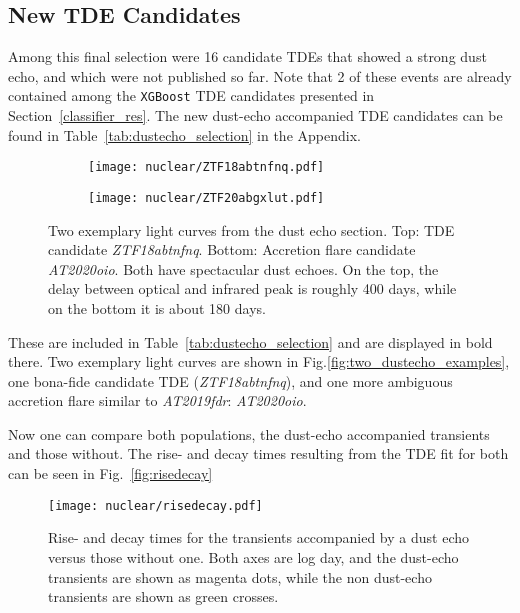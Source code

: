 \subsection{New TDE Candidates}

Among this final selection were 16 candidate TDEs that showed a strong dust echo, and which were not published so far. Note that 2 of these events are already contained among the \texttt{XGBoost} TDE candidates presented in Section~\ref{classifier_res}. The new dust-echo accompanied TDE candidates can be found in Table~\ref{tab:dustecho_selection} in the Appendix.

\begin{figure}[h!]
  \centering
  \begin{subfigure}[htb]{1\textwidth}
    \centering
    \texttt{[image: nuclear/ZTF18abtnfnq.pdf]}
  \end{subfigure}
  \begin{subfigure}[htb]{1\textwidth}
    \centering
    \texttt{[image: nuclear/ZTF20abgxlut.pdf]}
  \end{subfigure}
  \caption[Two exemplary light curves from the dust echo selection]{Two exemplary light curves from the dust echo section. Top: TDE candidate \textit{ZTF18abtnfnq}. Bottom: Accretion flare candidate \textit{AT2020oio}. Both have spectacular dust echoes. On the top, the delay between optical and infrared peak is roughly 400 days, while on the bottom it is about 180 days.}
\end{figure}

These are included in Table~\ref{tab:dustecho_selection} and are displayed in bold there. Two exemplary light curves are shown in Fig.\ref{fig:two_dustecho_examples}, one bona-fide candidate TDE (\textit{ZTF18abtnfnq}), and one more ambiguous accretion flare similar to \textit{AT2019fdr}: \textit{AT2020oio}.

Now one can compare both populations, the dust-echo accompanied transients and those without. The rise- and decay times resulting from the TDE fit for both can be seen in Fig.~\ref{fig:risedecay}

\begin{figure}[htb]
  \texttt{[image: nuclear/risedecay.pdf]}
  \caption[Dust and non-dust echo rise- and decay times]{Rise- and decay times for the transients accompanied by a dust echo versus those without one. Both axes are log day, and the dust-echo transients are shown as magenta dots, while the non dust-echo transients are shown as green crosses.}
\end{figure}

